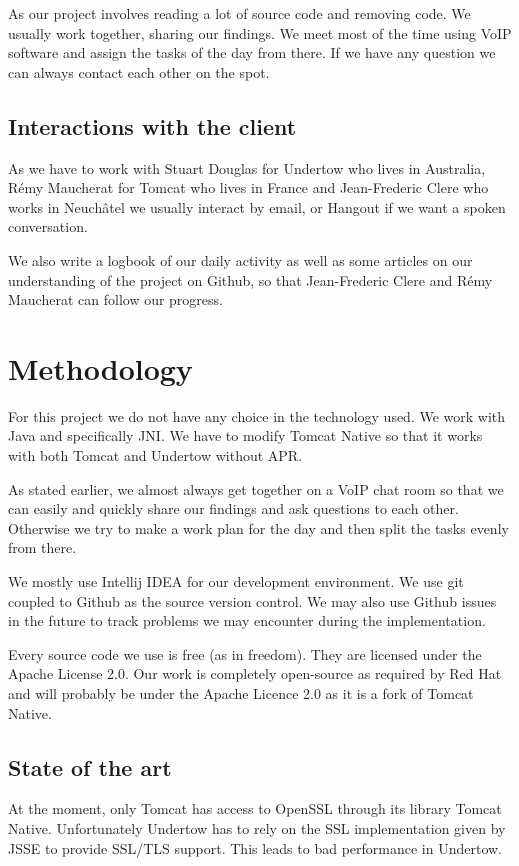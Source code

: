 \documentclass[11pt,a4paper,bibliography=totocnumbered]{scrartcl}
\begin{document}
As our project involves reading a lot of source code and removing code. We usually work together, sharing our findings. We meet most of the time using VoIP software and assign the tasks of the day from there. If we have any question we can always contact each other on the spot.

\subsection{Interactions with the client}

As we have to work with Stuart Douglas for Undertow who lives in Australia, Rémy Maucherat for Tomcat who lives in France and Jean-Frederic Clere who works in Neuchâtel we usually interact by email, or Hangout if we want a spoken conversation. 

We also write a logbook of our daily activity as well as some articles on our understanding of the project on Github, so that Jean-Frederic Clere and Rémy Maucherat can follow our progress.

\section{Methodology}

For this project we do not have any choice in the technology used. We work with Java and specifically JNI. We have to modify Tomcat Native so that it works with both Tomcat and Undertow without APR.

As stated earlier, we almost always get together on a VoIP chat room so that we can easily and quickly share our findings and ask questions to each other. Otherwise we try to make a work plan for the day and then split the tasks evenly from there.

We mostly use Intellij IDEA for our development environment. We use git coupled to Github as the source version control. We may also use Github issues in the future to track problems we may encounter during the implementation.

Every source code we use is free (as in freedom). They are licensed under the Apache License 2.0. Our work is completely open-source as required by Red Hat and will probably be under the Apache Licence 2.0 as it is a fork of Tomcat Native.
\subsection{State of the art}

At the moment, only Tomcat has access to OpenSSL through its library Tomcat Native. Unfortunately Undertow has to rely on the SSL implementation given by JSSE to provide SSL/TLS support. This leads to bad performance in Undertow.
\end{document}
